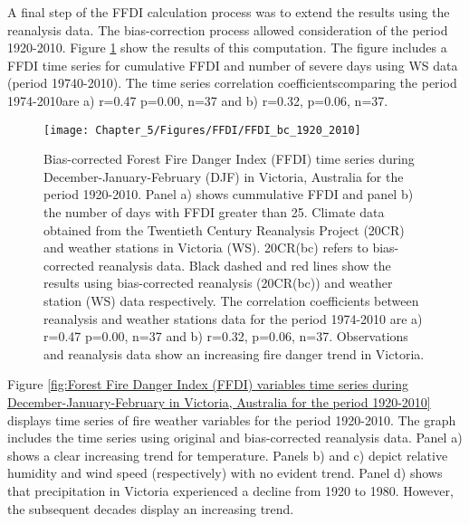A final step of the FFDI calculation process was to extend the results
using the reanalysis data. The bias-correction process allowed consideration of the period 1920-2010. Figure \ref{fig:Bias-corrected Forest Fire Danger Index (FFDI) time series during December-January-February in Victoria, Australia for the period 1920-2010}
show the results of this computation. The figure includes a FFDI time
series for cumulative FFDI and number of severe days using WS data (period 19740-2010). The time series correlation
coefficients\textemdash comparing the period 1974-2010\textemdash are
a) r=0.47 p=0.00, n=37 and b) r=0.32, p=0.06, n=37.

\begin{figure}[h]
\noindent \begin{centering}
\texttt{[image: Chapter\_5/Figures/FFDI/FFDI\_bc\_1920\_2010]}
\par\end{centering}

\caption[Bias-corrected Forest Fire Danger Index (FFDI) time series during
December-January-February (DJF) in Victoria, Australia for the period
1920-2010]{Bias-corrected Forest Fire Danger Index (FFDI) time series during
December-January-February (DJF) in Victoria, Australia for the period
1920-2010. Panel a) shows cummulative FFDI and panel b) the number
of days with FFDI greater than 25. Climate data obtained from the
Twentieth Century Reanalysis Project (20CR) and weather stations
in Victoria (WS). 20CR(bc) refers to bias-corrected reanalysis data.
Black dashed and red lines show the results using bias-corrected reanalysis
(20CR(bc)) and weather station (WS) data respectively. The correlation
coefficients between reanalysis and weather stations data for the period
1974-2010 are a) r=0.47 p=0.00, n=37 and b) r=0.32, p=0.06, n=37.
Observations and reanalysis data show an increasing fire danger trend
in Victoria. \label{fig:Bias-corrected Forest Fire Danger Index (FFDI) time series during December-January-February in Victoria, Australia for the period 1920-2010}}
\end{figure}


Figure \ref{fig:Forest Fire Danger Index (FFDI) variables time series during December-January-February in Victoria, Australia for the period 1920-2010}
displays time series of fire weather variables for the period 1920-2010.
The graph includes the time series using original and bias-corrected
reanalysis data. Panel a) shows a clear increasing trend for temperature.
Panels b) and c) depict relative humidity and wind speed (respectively)
with no evident trend. Panel d) shows that precipitation in Victoria
experienced a decline from 1920 to 1980. However, the subsequent decades
display an increasing trend. 

